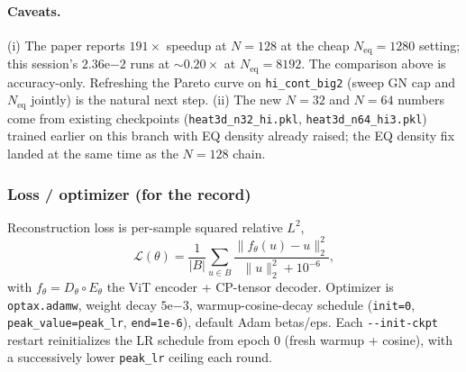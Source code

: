 \paragraph{Caveats.} (i) The paper reports $191\times$ speedup at
$N{=}128$ at the cheap $N_\mathrm{eq}{=}1280$ setting; this session's
$2.36\mathrm{e}{-2}$ runs at $\sim$$0.20\times$ at
$N_\mathrm{eq}{=}8192$. The comparison above is accuracy-only.
Refreshing the Pareto curve on \texttt{hi\_cont\_big2} (sweep GN cap
and $N_\mathrm{eq}$ jointly) is the natural next step. (ii) The new
$N=32$ and $N=64$ numbers come from existing checkpoints
(\texttt{heat3d\_n32\_hi.pkl}, \texttt{heat3d\_n64\_hi3.pkl}) trained
earlier on this branch with EQ density already raised; the EQ density
fix landed at the same time as the $N{=}128$ chain.

\subsubsection*{Loss / optimizer (for the record)}
Reconstruction loss is per-sample squared relative $L^2$,
\[
\mathcal{L}(\theta) = \frac{1}{|B|} \sum_{u \in B}
  \frac{\|f_\theta(u) - u\|_2^2}{\|u\|_2^2 + 10^{-6}},
\]
with $f_\theta = D_\theta \circ E_\theta$ the ViT encoder + CP-tensor
decoder.  Optimizer is \texttt{optax.adamw}, weight decay
$5\mathrm{e}{-3}$, warmup-cosine-decay schedule
(\texttt{init=0}, \texttt{peak\_value=peak\_lr}, \texttt{end=1e-6}),
default Adam betas/eps.  Each \texttt{-{}-init-ckpt} restart reinitializes
the LR schedule from epoch 0 (fresh warmup + cosine), with a
successively lower \texttt{peak\_lr} ceiling each round.
